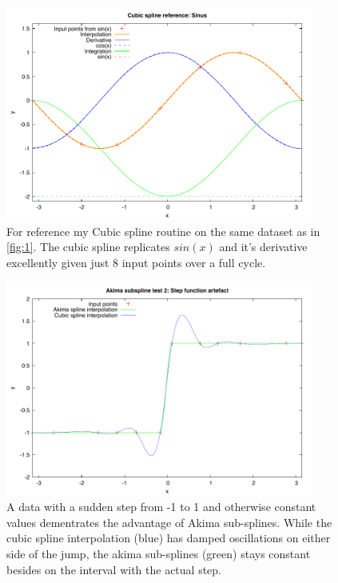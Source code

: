 \documentclass[a4paper]{article}
\begin{document}
\begin{figure}
    \label{fig:2}
    \centering
    \includegraphics[width=0.9\textwidth]{fig/cubic_spline_sin.pdf}
    \caption{For reference my Cubic spline routine on the same dataset as in \ref{fig:1}. The cubic spline replicates $sin(x)$ and it's derivative excellently given just 8 input points over a full cycle.}
\end{figure}

\begin{figure}
    \label{fig:3}
    \centering
    \includegraphics[width=0.9\textwidth]{fig/akima_spline_step.pdf}
    \caption{A data with a sudden step from -1 to 1 and otherwise constant values dementrates the advantage of Akima sub-splines. While the cubic spline interpolation (blue) has damped oscillations on either side of the jump, the akima sub-splines (green) stays constant besides on the interval with the actual step.}
\end{figure}
\end{document}
